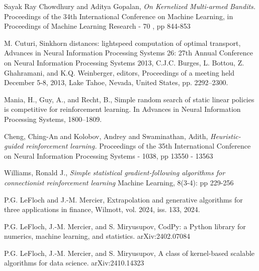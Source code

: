 \documentclass[
]{article}
\numberwithin{equation}{section}
\begin{document}
\begin{thebibliography}{1}

{\sc Sayak Ray Chowdhury and Aditya Gopalan}, 
{\sl On Kernelized Multi-armed Bandits.}
Proceedings of the 34th International Conference on Machine Learning, in Proceedings of Machine Learning Research - 70 , pp 844-853 

{\sc M. Cuturi,} 
Sinkhorn distances: lightspeed computation of optimal transport, 
 Advances in Neural Information
Processing Systems 26: 27th Annual Conference on Neural Information Processing Systems 2013, C.J.C. Burges, L. Bottou, Z. Ghahramani, and K.Q. Weinberger, editors, 
Proceedings of a meeting held December 5-8, 2013, Lake Tahoe, Nevada, United States, pp. 2292--2300.


{\sc Mania, H., Guy, A., and Recht, B.}, 
Simple random search of
static linear policies is competitive for reinforcement learning. In Advances in Neural Information Processing Systems, 1800–1809.


{\sc Cheng, Ching-An and Kolobov, Andrey and Swaminathan, Adith}, 
{\sl Heuristic-guided reinforcement learning.}
Proceedings of the 35th International Conference on Neural Information Processing Systems - 1038, pp 13550 - 13563



{\sc Williams, Ronald J.}, 
{\sl Simple statistical gradient-following algorithms for connectionist reinforcement learning}
Machine Learning, 8(3-4): pp 229-256


{\sc P.G. LeFloch and J.-M. Mercier,} 
Extrapolation and generative algorithms for three applications in finance,
Wilmott, vol. 2024, iss. 133, 2024.

{\sc P.G. LeFloch, J.-M. Mercier, and S. Miryusupov,}
CodPy: a Python library for numerics, machine learning, and statistics.
arXiv:2402.07084


{\sc P.G. LeFloch, J.-M. Mercier, and S. Miryusupov,}
A class of kernel-based scalable algorithms for data science. arXiv:2410.14323


\end{thebibliography}
\end{document}
